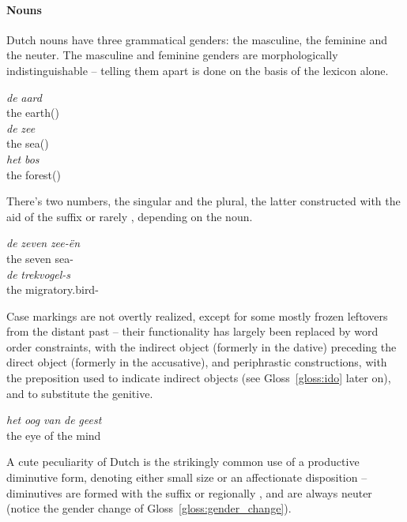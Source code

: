 \paragraph{Nouns}
Dutch nouns have three grammatical genders: the masculine, the feminine and the neuter.
The masculine and feminine genders are morphologically indistinguishable -- telling them apart is done on the basis of the lexicon alone.
\begin{exe}
\ex\label{gloss:genders}
\begin{xlist}
\ex
\gll \textit{de} \textit{aard}\\
the earth()\\
\ex
\gll \textit{de} \textit{zee}\\
the sea()\\
\ex
\gll \textit{het} \textit{bos}\\
the forest()\\
\end{xlist}
\end{exe}
There's two numbers, the singular and the plural, the latter constructed with the aid of the suffix  or rarely , depending on the noun.
\begin{exe}
\ex 
\begin{xlist}
\ex
\gll \textit{de} \textit{zeven} \textit{zee-\"{e}n}\\
the seven sea-\\
\ex
\gll \textit{de} \textit{trekvogel-s}\\
the  migratory.bird-\\
\end{xlist}
\end{exe}
Case markings are not overtly realized, except for some mostly frozen leftovers from the distant past -- their functionality has largely been replaced by word order constraints, with the indirect object (formerly in the dative) preceding the direct object (formerly in the accusative), and periphrastic constructions, with the preposition  used to indicate indirect objects (see Gloss~\ref{gloss:ido} later on), and  to substitute the genitive.
\begin{exe}
\ex
\gll \textit{het} \textit{oog} \textit{van} \textit{de} \textit{geest}\\
the eye of the mind\\
\end{exe}
A cute peculiarity of Dutch is the strikingly common use of a productive diminutive form, denoting either small size or an affectionate disposition -- diminutives are formed with the suffix  or regionally , and are always neuter (notice the gender change of Gloss~\ref{gloss:gender_change}).

